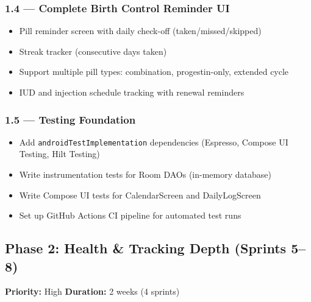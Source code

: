 \documentclass[12pt,a4paper]{article}
\begin{document}
\subsubsection{1.4 — Complete Birth Control Reminder UI}
\begin{itemize}[leftmargin=1.5em]
  \item Pill reminder screen with daily check-off (taken/missed/skipped)
  \item Streak tracker (consecutive days taken)
  \item Support multiple pill types: combination, progestin-only, extended cycle
  \item IUD and injection schedule tracking with renewal reminders
\end{itemize}

\subsubsection{1.5 — Testing Foundation}
\begin{itemize}[leftmargin=1.5em]
  \item Add \texttt{androidTestImplementation} dependencies (Espresso, Compose UI Testing, Hilt Testing)
  \item Write instrumentation tests for Room DAOs (in-memory database)
  \item Write Compose UI tests for CalendarScreen and DailyLogScreen
  \item Set up GitHub Actions CI pipeline for automated test runs
\end{itemize}

\subsection{\textcolor{phase2}{Phase 2: Health \& Tracking Depth (Sprints 5--8)}}

\begin{tcolorbox}[colback=phase2!5, colframe=phase2, title=\textbf{Goal: Match MyCalendar's tracking granularity}]
\textbf{Priority:} High \hfill \textbf{Duration:} 2 weeks (4 sprints)
\end{tcolorbox}
\end{document}
